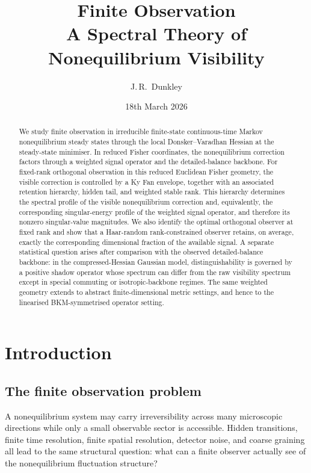 \documentclass[11pt,a4paper]{article}
\title{\textbf{Finite Observation}\\[0.2em]
\large A Spectral Theory of Nonequilibrium Visibility}
\author{J.\,R.~Dunkley}
\date{18th March 2026}
\numberwithin{equation}{section}
\theoremstyle{thmcompact}
\theoremstyle{remark}
\begin{document}
\maketitle

\begin{abstract}
We study finite observation in irreducible finite-state continuous-time Markov nonequilibrium steady states through the local Donsker–Varadhan Hessian at the steady-state minimiser. In reduced Fisher coordinates, the nonequilibrium correction factors through a weighted signal operator and the detailed-balance backbone. For fixed-rank orthogonal observation in this reduced Euclidean Fisher geometry, the visible correction is controlled by a Ky Fan envelope, together with an associated retention hierarchy, hidden tail, and weighted stable rank. This hierarchy determines the spectral profile of the visible nonequilibrium correction and, equivalently, the corresponding singular-energy profile of the weighted signal operator, and therefore its nonzero singular-value magnitudes. We also identify the optimal orthogonal observer at fixed rank and show that a Haar-random rank-constrained observer retains, on average, exactly the corresponding dimensional fraction of the available signal. A separate statistical question arises after comparison with the observed detailed-balance backbone: in the compressed-Hessian Gaussian model, distinguishability is governed by a positive shadow operator whose spectrum can differ from the raw visibility spectrum except in special commuting or isotropic-backbone regimes. The same weighted geometry extends to abstract finite-dimensional metric settings, and hence to the linearised BKM-symmetrised operator setting.
\end{abstract}

\newpage

\tableofcontents

\newpage

\section{Introduction}
\label{sec:introduction}

\subsection{The finite observation problem}

A nonequilibrium system may carry irreversibility across many microscopic directions while only a small observable sector is accessible. Hidden transitions, finite time resolution, finite spatial resolution, detector noise, and coarse graining all lead to the same structural question: what can a finite observer actually see of the nonequilibrium fluctuation structure?
\end{document}
